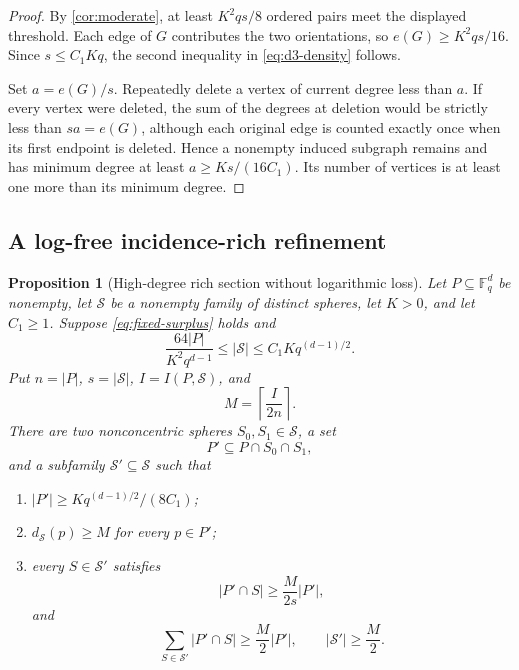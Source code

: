 \documentclass[11pt,letterpaper]{amsart}
\newtheorem{proposition}[proposition]{Proposition}
\theoremstyle{definition}
\theoremstyle{remark}
\newcommand{\1}{\mathbf 1}
\begin{document}
\begin{proof}
By \cref{cor:moderate}, at least $K^2qs/8$ ordered pairs meet the displayed threshold.  Each edge of $G$ contributes the two orientations, so $e(G)\ge K^2qs/16$.  Since $s\le C_1Kq$, the second inequality in \eqref{eq:d3-density} follows.

Set $a=e(G)/s$.  Repeatedly delete a vertex of current degree less than $a$.  If every vertex were deleted, the sum of the degrees at deletion would be strictly less than $sa=e(G)$, although each original edge is counted exactly once when its first endpoint is deleted.  Hence a nonempty induced subgraph remains and has minimum degree at least $a\ge Ks/(16C_1)$.  Its number of vertices is at least one more than its minimum degree.
\end{proof}

\subsection{A log-free incidence-rich refinement}

\begin{proposition}[High-degree rich section without logarithmic loss]\label{prop:logfree}
Let $P\subseteq\mathbb F_q^d$ be nonempty, let $\mathcal S$ be a nonempty family of distinct spheres, let $K>0$, and let $C_1\ge1$.  Suppose \eqref{eq:fixed-surplus} holds and
\begin{equation}\label{eq:logfree-window}
 \frac{64|P|}{K^2q^{d-1}}
 \le|\mathcal S|
 \le C_1Kq^{(d-1)/2}.
\end{equation}
Put $n=|P|$, $s=|\mathcal S|$, $I=I(P,\mathcal S)$, and
\[
 M=\left\lceil\frac{I}{2n}\right\rceil.
\]
There are two nonconcentric spheres $S_0,S_1\in\mathcal S$, a set
\[
 P'\subseteq P\cap S_0\cap S_1,
\]
and a subfamily $\mathcal S'\subseteq\mathcal S$ such that
\begin{enumerate}[label=\textup{(\arabic*)}]
\item $|P'|\ge Kq^{(d-1)/2}/(8C_1)$;
\item $d_{\mathcal S}(p)\ge M$ for every $p\in P'$;
\item every $S\in\mathcal S'$ satisfies
\[
 |P'\cap S|\ge\frac{M}{2s}|P'|,
\]
and
\[
 \sum_{S\in\mathcal S'}|P'\cap S|\ge\frac M2|P'|,
 \qquad |\mathcal S'|\ge\frac M2.
\]
\end{enumerate}
\end{proposition}
\end{document}
